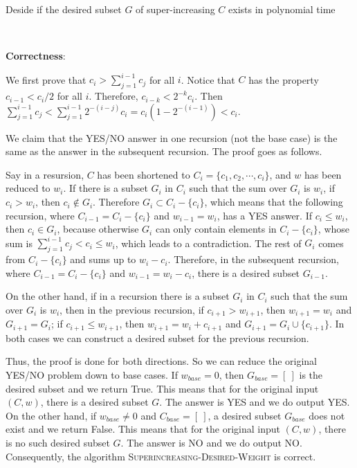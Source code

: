 \documentclass{article}
\begin{document}
\begin{algorithm}
\caption{Deside if the desired subset $G$ of super-increasing $C$ exists in polynomial time}
\begin{algorithmic}[1]
 
 
\Else{}
	 {\Return{}}
	\Else{} {\Return{}}
	\EndIf
\EndIf
\EndProcedure
\end{algorithmic}
\end{algorithm}

~

\noindent\textbf{Correctness}:


We first prove that $c_i>\sum_{j=1}^{i-1}c_j$ for all $i$. Notice that $C$ has the property $c_{i-1}<c_i/2$ for all $i$. Therefore, $c_{i-k}<2^{-k}c_i$. Then $\sum_{j=1}^{i-1}c_j<\sum_{j=1}^{i-1}2^{-(i-j)}c_i=c_i(1-2^{-(i-1)})<c_i$.

We claim that the YES/NO answer in one recursion (not the base case) is the same as the answer in the subsequent recursion. The proof goes as follows.

Say in a resursion, $C$ has been shortened to $C_i=\{c_1,c_2,\cdots,c_i\}$, and $w$ has been reduced to $w_i$. If there is a subset $G_i$ in $C_i$ such that the sum over $G_i$ is $w_i$, if $c_i>w_i$, then $c_i\notin G_i$. Therefore $G_i\subset C_i-\{c_i\}$, which means that the following recursion, where $C_{i-1}=C_i-\{c_i\}$ and $w_{i-1}=w_i$, has a YES answer. If $c_i\leqslant w_i$, then $c_i\in G_i$, because otherwise $G_i$ can only contain elements in $C_i-\{c_i\}$, whose sum is $\sum_{j=1}^{i-1}c_j<c_i\leqslant w_i$, which leads to a contradiction. The rest of $G_i$ comes from $C_i-\{c_i\}$ and sums up to $w_i-c_i$. Therefore, in the subsequent recursion, where $C_{i-1}=C_i-\{c_i\}$ and $w_{i-1}=w_i-c_i$, there is a desired subset $G_{i-1}$.

On the other hand, if in a recursion there is a subset $G_i$ in $C_i$ such that the sum over $G_i$ is $w_i$, then in the previous recursion, if $c_{i+1}>w_{i+1}$, then $w_{i+1}=w_i$ and $G_{i+1}=G_i$; if $c_{i+1}\leqslant w_{i+1}$, then $w_{i+1}=w_i+c_{i+1}$ and $G_{i+1}=G_i\cup\{c_{i+1}\}$. In both cases we can construct a desired subset for the previous recursion.

Thus, the proof is done for both directions. So we can reduce the original YES/NO problem down to base cases. If $w_{base}=0$, then $G_{base}=[~]$ is the desired subset and we return True. This means that for the original input $(C,w)$, there is a desired subset $G$. The answer is YES and we do output YES. On the other hand, if $w_{base}\neq0$ and $C_{base}=[~]$, a desired subset $G_{base}$ does not exist and we return False. This means that for the original input $(C,w)$, there is no such desired subset $G$. The answer is NO and we do output NO. Consequently, the algorithm \textsc{Superincreasing-Desired-Weight} is correct.
\end{document}

